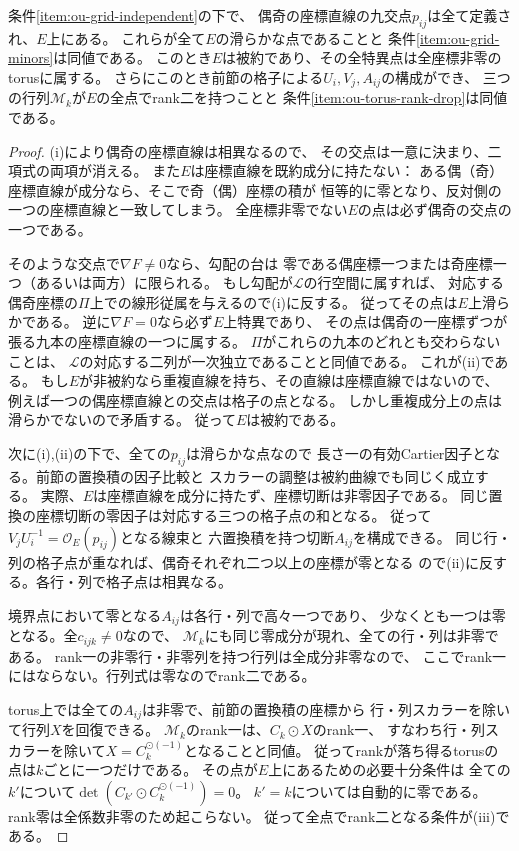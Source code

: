 \begin{lemma}[格子の特異点とtorus上のrank落ち]
\label{lem:ou-grid-and-rank-drop-tests}
条件\ref{item:ou-grid-independent}の下で、
偶奇の座標直線の九交点$p_{ij}$は全て定義され、$E$上にある。
これらが全て$E$の滑らかな点であることと
条件\ref{item:ou-grid-minors}は同値である。
このとき$E$は被約であり、その全特異点は全座標非零のtorusに属する。
さらにこのとき前節の格子による$U_i,V_j,A_{ij}$の構成ができ、
三つの行列$\mathscr M_k$が$E$の全点でrank二を持つことと
条件\ref{item:ou-torus-rank-drop}は同値である。
\end{lemma}
\begin{proof}
(i)により偶奇の座標直線は相異なるので、
その交点は一意に決まり、二項式の両項が消える。
また$E$は座標直線を既約成分に持たない：
ある偶（奇）座標直線が成分なら、そこで奇（偶）座標の積が
恒等的に零となり、反対側の一つの座標直線と一致してしまう。
全座標非零でない$E$の点は必ず偶奇の交点の一つである。

そのような交点で$\nabla F\ne0$なら、勾配の台は
零である偶座標一つまたは奇座標一つ（あるいは両方）に限られる。
もし勾配が$\mathcal L$の行空間に属すれば、
対応する偶奇座標の$\Pi$上での線形従属を与えるので(i)に反する。
従ってその点は$E$上滑らかである。
逆に$\nabla F=0$なら必ず$E$上特異であり、
その点は偶奇の一座標ずつが張る九本の座標直線の一つに属する。
$\Pi$がこれらの九本のどれとも交わらないことは、
$\mathcal L$の対応する二列が一次独立であることと同値である。
これが(ii)である。
もし$E$が非被約なら重複直線を持ち、その直線は座標直線ではないので、
例えば一つの偶座標直線との交点は格子の点となる。
しかし重複成分上の点は滑らかでないので矛盾する。
従って$E$は被約である。

次に(i),(ii)の下で、全ての$p_{ij}$は滑らかな点なので
長さ一の有効Cartier因子となる。前節の置換積の因子比較と
スカラーの調整は被約曲線でも同じく成立する。
実際、$E$は座標直線を成分に持たず、座標切断は非零因子である。
同じ置換の座標切断の零因子は対応する三つの格子点の和となる。
従って$V_j U_i^{-1}=\mathcal O_E(p_{ij})$となる線束と
六置換積を持つ切断$A_{ij}$を構成できる。
同じ行・列の格子点が重なれば、偶奇それぞれ二つ以上の座標が零となる
ので(ii)に反する。各行・列で格子点は相異なる。

境界点において零となる$A_{ij}$は各行・列で高々一つであり、
少なくとも一つは零となる。全$c_{ijk}\ne0$なので、
$\mathscr M_k$にも同じ零成分が現れ、全ての行・列は非零である。
rank一の非零行・非零列を持つ行列は全成分非零なので、
ここでrank一にはならない。行列式は零なのでrank二である。

torus上では全ての$A_{ij}$は非零で、前節の置換積の座標から
行・列スカラーを除いて行列$X$を回復できる。
$\mathscr M_k$のrank一は、$C_k\odot X$のrank一、
すなわち行・列スカラーを除いて$X=C_k^{\odot(-1)}$となることと同値。
従ってrankが落ち得るtorusの点は$k$ごとに一つだけである。
その点が$E$上にあるための必要十分条件は
全ての$k'$について$\det(C_{k'}\odot C_k^{\odot(-1)})=0$。
$k'=k$については自動的に零である。
rank零は全係数非零のため起こらない。
従って全点でrank二となる条件が(iii)である。
\end{proof}

